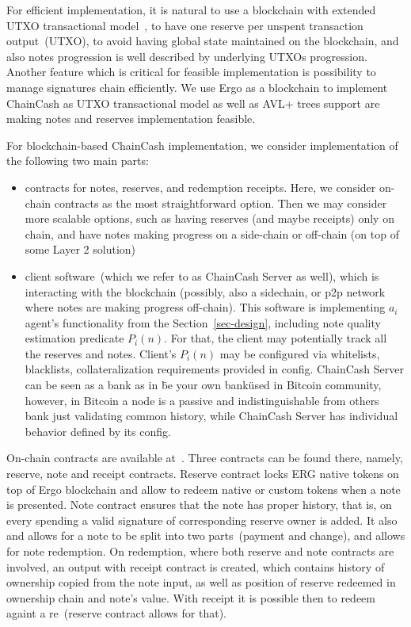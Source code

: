 \documentclass{llncs}   %
\newcommand{\cc}{ChainCash}
\begin{document}
For efficient implementation, it is natural to use a blockchain with extended UTXO transactional model~\cite{chakravarty2020extended}, to have one reserve per unspent transaction output~(UTXO), to
avoid having global state maintained on the blockchain, and also notes progression is well described by underlying UTXOs progression. Another feature which is critical for feasible implementation is
possibility to manage signatures chain efficiently. We use Ergo as a blockchain to implement \cc{} as UTXO transactional model as well as AVL+ trees support are making notes and reserves implementation feasible.

For blockchain-based \cc{} implementation, we consider implementation of the following two main parts:

\begin{itemize}
  \item{} contracts for notes, reserves, and redemption receipts. Here, we consider on-chain contracts as the most
  straightforward option. Then we may consider more scalable options, such as having reserves (and maybe receipts) only
  on chain, and have notes making progress on a side-chain or off-chain (on top of some Layer 2 solution)
  \item{} client software~(which we refer to as \cc{} Server as well), which is interacting with the blockchain (possibly, also a sidechain, or p2p network
  where notes are making progress off-chain). This software is implementing $a_i$ agent's functionality from the Section~\ref{sec-design},
  including note quality estimation predicate $P_i(n)$. For that, the client may potentially track all the reserves and notes.
  Client's $P_i(n)$ may be configured via whitelists, blacklists, collateralization requirements provided in config.
  \cc{} Server can be seen as a bank as in \"be your own bank\" used in Bitcoin community, however, in Bitcoin a node
  is a passive and indistinguishable from others bank just validating common history, while \cc{} Server has individual behavior defined by its config.
\end{itemize}

On-chain contracts are available at~\cite{contracts}. Three contracts can be found there, namely, reserve, note and receipt contracts. Reserve contract locks ERG native tokens on top of Ergo blockchain and allow to redeem native or custom tokens when a note is presented. Note contract ensures that the note has proper history, that is, on every spending a valid signature of corresponding reserve owner is added. It also and allows for a note to be split into two parts~(payment and change), and allows for note redemption.
On redemption, where both reserve and note contracts are involved, an output with receipt contract is created, which contains history of ownership copied from the note input, as well as position of reserve redeemed in ownership chain and note's value. With receipt it is possible then to redeem againt a re~(reserve contract allows for that).
\end{document}
